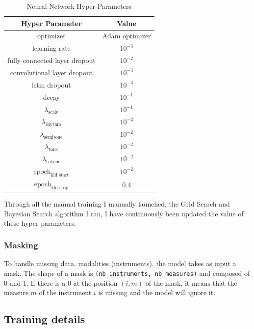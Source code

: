 \documentclass[12pt]{report}
\begin{document}
\begin{table}[]
    \centering
    \begin{tabular}{c|c}
        Hyper Parameter & Value \\
        \hline
        optimizer &  Adam optimizer \cite{brownlee_gentle_2017, bushaev_adam_2018, kingma_adam_2017} \\
        learning rate & $10^{-3}$ \\
        fully connected layer dropout & $10^{-2}$ \\
        convolutional layer dropout & $10^{-3}$ \\
        lstm dropout & $10^{-3}$ \\
        decay & $10^{-1}$ \\
        $\lambda_{\text{scale}}$ & $10^{-1}$ \\
        $\lambda_{\text{rhythm}}$ & $10^{-2}$ \\
        $\lambda_{\text{semitone}}$ & $10^{-2}$ \\
        $\lambda_{\text{tone}}$ & $10^{-2}$ \\
        $\lambda_{\text{tritone}}$ & $10^{-2}$ \\
        $\text{epoch}_{\text{kld start}}$ & $10^{-2}$ \\
        $\text{epoch}_{\text{kld stop}}$ & $0.4$ \\
    \end{tabular}
    \caption{Neural Network Hyper-Parameters}
    \label{tab:network-hp}
\end{table}

Through all the manual training I manually launched, the Grid Search and Bayesian Search algorithm I ran, I have continuously been updated the value of these hyper-parameters.

\subsubsection{Masking}

To handle missing data, modalities (instruments), the model takes as input a mask.
The shape of a mask is \texttt{(nb\_instruments, nb\_measures)} and composed of 0 and 1.
If there is a 0 at the position $(i, m)$ of the mask, it means that the measure $m$ of the instrument $i$ is missing and the model will ignore it.


\subsection{Training details}
\end{document}
